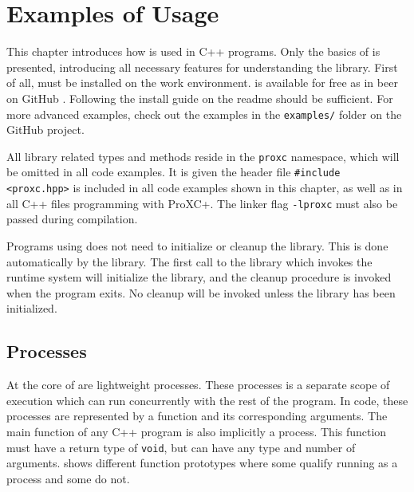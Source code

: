 

\chapter{Examples of Usage}
\label{ch:examples_usage}

This chapter introduces how \Proxc{} is used in C++ programs. Only the basics of \Proxc{} is presented, introducing all necessary features for understanding the library. First of all, \Proxc{} must be installed on the work environment. \Proxc{} is available for free as in beer on GitHub \citep{pettersen2017proxcgithub}. Following the install guide on the readme should be sufficient. For more advanced examples, check out the examples in the \texttt{examples/} folder on the GitHub project.

All library related types and methods reside in the \lstinline[style={CustomC++}]|proxc| namespace, which will be omitted in all code examples. It is given the header file \lstinline[style={CustomC++}]|#include <proxc.hpp>| is included in all code examples shown in this chapter, as well as in all C++ files programming with ProXC+. The linker flag \lstinline[style={CustomC++}]|-lproxc| must also be passed during compilation.

Programs using \Proxc{} does not need to initialize or cleanup the library. This is done automatically by the library. The first call to the library which invokes the runtime system will initialize the library, and the cleanup procedure is invoked when the program exits. No cleanup will be invoked unless the library has been initialized. 


\section{Processes}


At the core of \Proxc{} are lightweight processes. These processes is a separate scope of execution which can run concurrently with the rest of the program. In code, these processes are represented by a function and its corresponding arguments. The main function of any C++ program is also implicitly a process. This function must have a return type of \lstinline[style={CustomC++}]|void|, but can have any type and number of arguments.  shows different function prototypes where some qualify running as a process and some do not.

